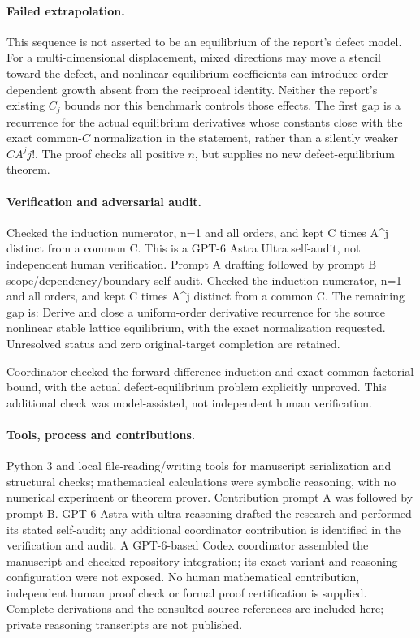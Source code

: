 \documentclass[11pt]{article}
\begin{document}
\paragraph{Failed extrapolation.} This sequence is not asserted to be an equilibrium of the report's defect model. For a multi-dimensional displacement, mixed directions may move a stencil toward the defect, and nonlinear equilibrium coefficients can introduce order-dependent growth absent from the reciprocal identity. Neither the report's existing \(C_j\) bounds nor this benchmark controls those effects. The first gap is a recurrence for the actual equilibrium derivatives whose constants close with the exact common-\(C\) normalization in the statement, rather than a silently weaker \(C A^j j!\). The proof checks all positive \(n\), but supplies no new defect-equilibrium theorem.

\paragraph{Verification and adversarial audit.}
Checked the induction numerator, n=1 and all orders, and kept C times A\textasciicircum{}j distinct from a common C. This is a GPT-6 Astra Ultra self-audit, not independent human verification. Prompt A drafting followed by prompt B scope/dependency/boundary self-audit. Checked the induction numerator, n=1 and all orders, and kept C times A\textasciicircum{}j distinct from a common C. The remaining gap is: Derive and close a uniform-order derivative recurrence for the source nonlinear stable lattice equilibrium, with the exact normalization requested. Unresolved status and zero original-target completion are retained.

Coordinator checked the forward-difference induction and exact common factorial bound, with the actual defect-equilibrium problem explicitly unproved. This additional check was model-assisted, not independent human verification.

\paragraph{Tools, process and contributions.}
Python 3 and local file-reading/writing tools for manuscript serialization and structural checks; mathematical calculations were symbolic reasoning, with no numerical experiment or theorem prover. Contribution prompt A was followed by prompt B. GPT-6 Astra with ultra reasoning drafted the research and performed its stated self-audit; any additional coordinator contribution is identified in the verification and audit. A GPT-6-based Codex coordinator assembled the manuscript and checked repository integration; its exact variant and reasoning configuration were not exposed. No human mathematical contribution, independent human proof check or formal proof certification is supplied. Complete derivations and the consulted source references are included here; private reasoning transcripts are not published.
\end{document}

